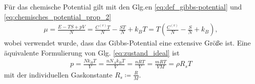 \documentclass{book}
\begin{document}
%
Für das chemische Potential gilt mit den Glg.en \eqref{eq:def_gibbs-potential} und \eqref{eq:chemisches_potential_prop_2}
%
\begin{eqnarray}
\mu = \frac{E - TS + pV}{N} = \frac{C^{(v)}T}{N} - \frac{ST}{N} + k_BT = T\left(\frac{C^{(v)}}{N} - \frac{S}{N} + k_B\right),\label{eq:chemical_potential_id_gas}
\end{eqnarray}
%
wobei verwendet wurde, dass das Gibbs-Potential eine extensive Größe ist. Eine äquivalente Formulierung von Glg. \eqref{eq:zustand_ideal} ist
%
\begin{eqnarray}
p = \frac{Nk_BT}{V} = \frac{nN_Ak_BT}{V} = \frac{nRT}{V} = \frac{mRT}{VM} = \rho R_sT\label{eq:zustand_ideal_alt}
\end{eqnarray}
%
mit der individuellen Gaskonstante $R_s \coloneqq \frac{R}{M}$.
\end{document}
